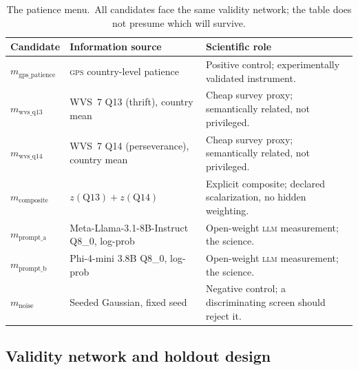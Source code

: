 \documentclass[10pt,letterpaper]{article}
\newcommand{\LLM}{\textsc{llm}}
\newcommand{\GPS}{\textsc{gps}}
\begin{document}
\begin{table}[t]
\centering
\small
\caption{The patience menu.\
All candidates face the same validity network; the table does not presume which will survive.}
\label{tab:menu}
\begin{tabularx}{\textwidth}{@{}>{\raggedright\arraybackslash}p{2.9cm} >{\raggedright\arraybackslash}p{4.1cm} X@{}}
\toprule
\textbf{Candidate} & \textbf{Information source} & \textbf{Scientific role} \\
\midrule
$m_{\mathrm{gps\_patience}}$ & \GPS{} country-level patience & Positive control; experimentally validated instrument. \\
$m_{\mathrm{wvs\_q13}}$ & WVS~7 Q13 (thrift), country mean & Cheap survey proxy; semantically related, not privileged. \\
$m_{\mathrm{wvs\_q14}}$ & WVS~7 Q14 (perseverance), country mean & Cheap survey proxy; semantically related, not privileged. \\
$m_{\mathrm{composite}}$ & $z(\mathrm{Q13})+z(\mathrm{Q14})$ & Explicit composite; declared scalarization, no hidden weighting. \\
$m_{\mathrm{prompt\_a}}$ & Meta-Llama-3.1-8B-Instruct Q8\_0, log-prob & Open-weight \LLM{} measurement; the science. \\
$m_{\mathrm{prompt\_b}}$ & Phi-4-mini 3.8B Q8\_0, log-prob & Open-weight \LLM{} measurement; the science. \\
$m_{\mathrm{noise}}$ & Seeded Gaussian, fixed seed & Negative control; a discriminating screen should reject it. \\
\bottomrule
\end{tabularx}
\end{table}

\subsection{Validity network and holdout design}
\label{sec:app-network}
\end{document}
